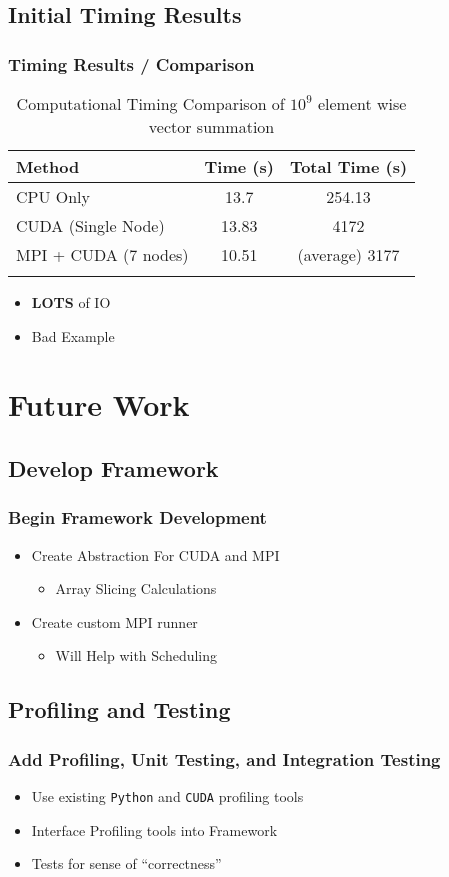 \documentclass{beamer}
\begin{document}
\subsection{Initial Timing Results}
\begin{frame}
\frametitle{Timing Results / Comparison}
\begin{table}[htb]
\centering
\begin{tabular}{lcc}
\toprule{}
\textbf{Method} & \textbf{Time (s)} & \textbf{Total Time (s)} \\
\midrule{}
CPU Only & 13.7 & 254.13 \\
\midrule{}
CUDA (Single Node) & 13.83 & 4172 \\
\midrule{}
MPI + CUDA (7 nodes) & 10.51 & (average) 3177 \\
\bottomrule{}
\end{tabular}
\caption{Computational Timing Comparison of $ 10^9 $ element wise vector
summation}
\label{tab:compTimeComapare}
\end{table}
\begin{itemize}
\item{\textbf{LOTS} of IO}
\item{Bad Example}
\end{itemize}
\end{frame}
\section{Future Work}
\subsection{Develop Framework}
\begin{frame}
\frametitle{Begin Framework Development}
\begin{itemize}
\item{Create Abstraction For CUDA and MPI}
\begin{itemize}
\item{Array Slicing Calculations}
\end{itemize}
\item{Create custom MPI runner}
\begin{itemize}
\item{Will Help with Scheduling}
\end{itemize}
\end{itemize}
\end{frame}
\subsection{Profiling and Testing}
\begin{frame}
\frametitle{Add Profiling, Unit Testing, and Integration Testing}
\begin{itemize}
\item{Use existing \texttt{Python} and \texttt{CUDA} profiling tools}
\item{Interface Profiling tools into Framework}
\item{Tests for sense of ``correctness''}
\end{itemize}
\end{frame}
\end{document}
